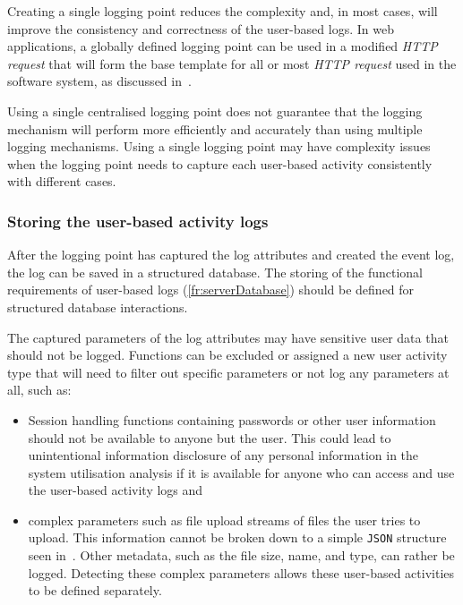 Creating a single logging point reduces the complexity and, in most cases, will improve the consistency and correctness of the user-based logs. In web applications, a globally defined logging point can be used in a modified \textit{HTTP request} that will form the base template for all or most \textit{HTTP request} used in the software system, as discussed in~. \par Using a single centralised logging point does not guarantee that the logging mechanism will perform more efficiently and accurately than using multiple logging mechanisms. Using a single logging point may have complexity issues when the logging point needs to capture each user-based activity consistently with different cases.

\subsubsection{Storing the user-based activity logs}\label{sec:ch2_databaseStorage}
After the logging point has captured the log attributes and created the event log, the log can be saved in a structured database. The storing of the functional requirements of user-based logs (\ref{fr:serverDatabase}) should be defined for structured database interactions.\par The captured parameters of the log attributes may have sensitive user data that should not be logged. Functions can be excluded or assigned a new user activity type that will need to filter out specific parameters or not log any parameters at all, such as:

\begin{itemize}
	\item Session handling functions containing passwords or other user information should not be available to anyone but the user. This could lead to unintentional information disclosure of any personal information in the system utilisation analysis if it is available for anyone who can access and use the user-based activity logs and
	\item complex parameters such as file upload streams of files the user tries to upload. This information cannot be broken down to a simple \texttt{JSON} structure seen in~. Other metadata, such as the file size, name, and type, can rather be logged. Detecting these complex parameters allows these user-based activities to be defined separately.
\end{itemize}

